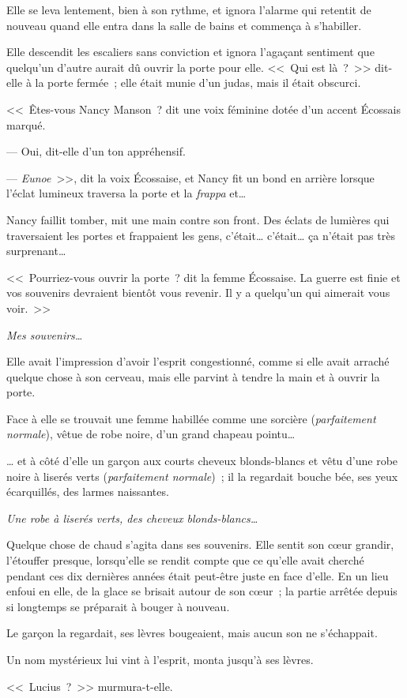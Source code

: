 Elle se leva lentement, bien à son rythme, et ignora l'alarme qui retentit de nouveau quand elle entra dans la salle de bains et commença à s'habiller.

Elle descendit les escaliers sans conviction et ignora l'agaçant sentiment que quelqu'un d'autre aurait dû ouvrir la porte pour elle. <<~Qui est là~?~>> dit-elle à la porte fermée~; elle était munie d'un judas, mais il était obscurci.

<<~Êtes-vous Nancy Manson~? dit une voix féminine dotée d'un accent Écossais marqué.

--- Oui, dit-elle d'un ton appréhensif.

--- \emph{Eunoe}~>>, dit la voix Écossaise, et Nancy fit un bond en arrière lorsque l'éclat lumineux traversa la porte et la \emph{frappa} et…

Nancy faillit tomber, mit une main contre son front. Des éclats de lumières qui traversaient les portes et frappaient les gens, c'était… c'était… ça n'était pas très surprenant…

<<~Pourriez-vous ouvrir la porte~? dit la femme Écossaise. La guerre est finie et vos souvenirs devraient bientôt vous revenir. Il y a quelqu'un qui aimerait vous voir.~>>

\emph{Mes souvenirs…}

Elle avait l'impression d'avoir l'esprit congestionné, comme si elle avait arraché quelque chose à son cerveau, mais elle parvint à tendre la main et à ouvrir la porte.

Face à elle se trouvait une femme habillée comme une sorcière (\emph{parfaitement normale}), vêtue de robe noire, d'un grand chapeau pointu…

… et à côté d'elle un garçon aux courts cheveux blonds-blancs et vêtu d'une robe noire à liserés verts (\emph{parfaitement normale})~; il la regardait bouche bée, ses yeux écarquillés, des larmes naissantes.

\emph{Une robe à liserés verts, des cheveux blonds-blancs…}

Quelque chose de chaud s'agita dans ses souvenirs. Elle sentit son cœur grandir, l'étouffer presque, lorsqu'elle se rendit compte que ce qu'elle avait cherché pendant ces dix dernières années était peut-être juste en face d'elle. En un lieu enfoui en elle, de la glace se brisait autour de son cœur~; la partie arrêtée depuis si longtemps se préparait à bouger à nouveau.

Le garçon la regardait, ses lèvres bougeaient, mais aucun son ne s'échappait.

Un nom mystérieux lui vint à l'esprit, monta jusqu'à ses lèvres.

<<~Lucius~?~>> murmura-t-elle.

